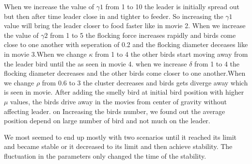 \documentclass{article}
\begin{document}
When we increase the value of {$\gamma1$} from 1 to 10 the leader is initially spread out but then after time leader close in and tighter to feeder. So increasing the {$\gamma1$} value will bring the leader closer to food faster like in movie 2.
When we increase the value of {$\gamma2$} from 1 to 5 the flocking force increases rapidly and birds come close to one another with seperation of 0.2 and the flocking diameter deceases like in movie 3.When we change {$\kappa$} from 1 to 4 the other birds start moving away from the leader bird until the  as seen in movie 4.
when we increase {$\delta$} from 1 to 4 the flocking diameter decreases and the other birds come closer to one another.When we change {$\rho$} from 0.6 to 3 the cluster decreases and birds gets diverge away which is seen in movie. After adding the smelly bird at initial bird position with higher $\mu$ values, the birds drive away in the movies from center of gravity without affecting leader. on Increasing the birds number, we found out the average position depend on large number of bird and not much on the leader.

We most seemed to end up mostly with two scenarios until it reached its limit and became stable or it decreased to its limit and then achieve stability. The fluctuation in the parameters only changed the time of the stability.
\end{document}
